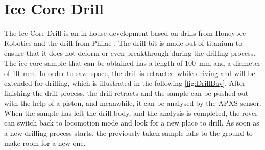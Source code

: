 \section{Ice Core Drill} \label{sec:IceCoreDrill}
The Ice Core Drill is an in-house development based on drills from Honeybee Robotics \cite{Honeybee1, Honeybee2} and the drill from Philae \cite{PhilaeDrill}. The drill bit is made out of titanium to ensure that it does not deform or even breakthrough during the drilling process.
The ice core sample that can be obtained has a length of 100~mm and a diameter of 10~mm.
In order to save space, the drill is retracted while driving and will be extended for drilling, which is illustrated in the following \autoref{fig:DrillBay}.
After finishing the drill process, the drill retracts and the sample can be pushed out with the help of a piston, and meanwhile, it can be analysed by the APXS sensor.
When the sample has left the drill body, and the analysis is completed, the rover can switch back to locomotion mode and look for a new place to drill. As soon as a new drilling process starts, the previously taken sample falls to the ground to make room for a new one.

